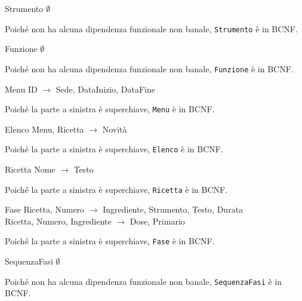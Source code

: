 \begin{samepage}
\begin{funcdep}{Strumento}
    $\emptyset$
\end{funcdep}
Poiché non ha alcuna dipendenza funzionale non banale, {\tt Strumento} è in BCNF.
\end{samepage}

\begin{samepage}
\begin{funcdep}{Funzione}
    $\emptyset$
\end{funcdep}
Poiché non ha alcuna dipendenza funzionale non banale, {\tt Funzione} è in BCNF.
\end{samepage}

\begin{samepage}
\begin{funcdep}{Menu}
    ID $\to$ Sede, DataInizio, DataFine
\end{funcdep}
Poiché la parte a sinistra è superchiave, {\tt Menu} è in BCNF.
\end{samepage}

\begin{samepage}
\begin{funcdep}{Elenco}
    Menu, Ricetta $\to$ Novità
\end{funcdep}
Poiché la parte a sinistra è superchiave, {\tt Elenco} è in BCNF.
\end{samepage}

\begin{samepage}
\begin{funcdep}{Ricetta}
    Nome $\to$ Testo
\end{funcdep}
Poiché la parte a sinistra è superchiave, {\tt Ricetta} è in BCNF.
\end{samepage}

\begin{samepage}
\begin{funcdep}{Fase}
    Ricetta, Numero $\to$ Ingrediente, Strumento, Testo, Durata\\
    Ricetta, Numero, Ingrediente $\to$ Dose, Primario
\end{funcdep}
Poiché la parte a sinistra è superchiave, {\tt Fase} è in BCNF.
\end{samepage}

\begin{samepage}
\begin{funcdep}{SequenzaFasi}
    $\emptyset$
\end{funcdep}
Poiché non ha alcuna dipendenza funzionale non banale, {\tt SequenzaFasi} è in BCNF.
\end{samepage}

